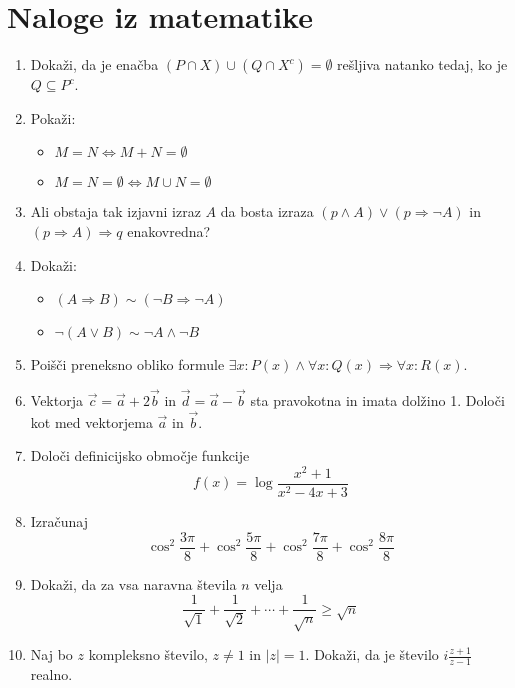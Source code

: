 \documentclass[a4paper,12pt]{article}
\begin{document}
\section*{Naloge iz matematike}
\begin{enumerate}
\item
Dokaži, da je enačba $(P \cap X) \cup (Q \cap X^c) = \emptyset$
rešljiva natanko tedaj, ko je $Q \subseteq P^c$.

\item
Pokaži:
\begin{itemize}
    \item $M = N \iff M + N = \emptyset$
    \item $M = N = \emptyset \iff M \cup N = \emptyset$
\end{itemize}

\item
Ali obstaja tak izjavni izraz $A$ da bosta izraza
$(p \land A) \lor (p \Rightarrow \neg A)$ in $(p \Rightarrow A) \Rightarrow q$
enakovredna?

\item
Dokaži:
\begin{itemize}
    \item $(A \Rightarrow B) \sim (\neg B \Rightarrow \neg A)$
    \item $\neg (A \lor B) \sim \neg A \land \neg B$
\end{itemize}

\item
Poišči preneksno obliko formule $\exists x : P(x) \land \forall x :
Q(x) \Rightarrow \forall x : R(x)$.

\item
Vektorja $\vec{c} = \vec{a} + 2\vec{b}$ in $\vec{d} = \vec{a} - \vec{b}$
sta pravokotna in imata dolžino 1. Določi kot med vektorjema $\vec{a}$ in $\vec{b}$.

\item
Določi definicijsko območje funkcije
\[
    f(x) = \log \frac{x^2 + 1}{x^2 - 4x + 3}
\]

\item
Izračunaj
\[
    \cos^2 \frac{3\pi}{8} + \cos^2 \frac{5\pi}{8} + 
    \cos^2 \frac{7\pi}{8} + \cos^2 \frac{8\pi}{8}
\]

\item
Dokaži, da za vsa naravna števila $n$ velja
\[
    \frac{1}{\sqrt{1}} + \frac{1}{\sqrt{2}} + \cdots + \frac{1}{\sqrt{n}} \geq \sqrt{n}  
\]

\item
Naj bo $z$ kompleksno število, $z \neq 1$ in $|z| = 1$.
Dokaži, da je število $i \frac{z+1}{z-1}$ realno.


\end{enumerate}
\end{document}
